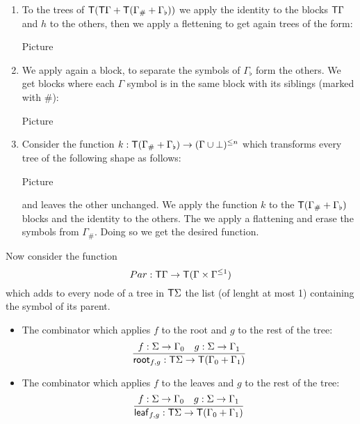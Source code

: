 \begin{example}
\begin{enumerate}
\item To the trees of $\mathsf T(\mathsf T\Gamma+\mathsf T(\Gamma_\#+\Gamma_\flat))$ we apply the identity to the blocks $\mathsf T \Gamma$ and $h$ to the others, then we apply a flettening to get again trees of the form:
\begin{center}
Picture
\end{center} 
\item We apply again a block, to separate the symbols of $\Gamma_\flat$ form the others. We get blocks where each $\Gamma$ symbol is in the same block with its siblings (marked with $\#$):
\begin{center}
Picture
\end{center}
\item Consider the function $k:\mathsf T(\Gamma_\#+\Gamma_\flat)\to (\Gamma\cup\bot)^{\leq n}$ which transforms every tree of the following shape as follows:
\begin{center}
Picture
\end{center}
and leaves the other unchanged. We apply the function $k$ to the $\mathsf T(\Gamma_\#+\Gamma_\flat)$
blocks and the identity to the others. The we apply a flattening and erase the symbols from $\Gamma_\#$. Doing so we get the desired function.
\end{enumerate}
\medskip

Now consider the function $$Par:\mathsf T\Gamma\to \mathsf T (\Gamma\times \Gamma^{\leq 1})$$ which adds to every node of a tree in $\mathsf T \Sigma$ the list (of lenght at most 1) containing the symbol of its parent.
\end{example}



\bigskip
\noindent  \begin{example}
\begin{itemize}
\item The combinator which applies $f$ to the root and $g$ to the rest of the tree:
\begin{align*}
    \frac{f : \Sigma \to \Gamma_0 \quad g : \Sigma \to \Gamma_1}
     {\mathsf{root}_{f,g} : \mathsf T\Sigma \to \mathsf T(\Gamma_0 + \Gamma_1)}
\end{align*}
\item The combinator which applies $f$ to the leaves and $g$ to the rest of the tree:
\begin{align*}
    \frac{f : \Sigma \to \Gamma_0 \quad g : \Sigma \to \Gamma_1}
     {\mathsf{leaf}_{f,g} : \mathsf T\Sigma \to \mathsf T(\Gamma_0 + \Gamma_1)}
\end{align*}
\end{itemize}
\end{example}

